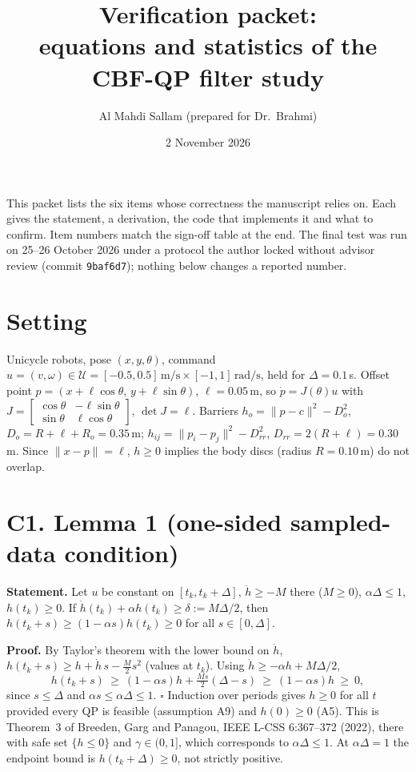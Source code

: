 \documentclass[10pt]{article}
\title{Verification packet:\\ equations and statistics of the CBF-QP filter study}
\author{Al Mahdi Sallam (prepared for Dr.~Brahmi)}
\date{2 November 2026}
\begin{document}
\maketitle
\noindent This packet lists the six items whose correctness the manuscript relies on. Each gives the
statement, a derivation, the code that implements it and what to confirm. Item numbers match the
sign-off table at the end. The final test was run on 25--26 October 2026 under a protocol the author
locked without advisor review (commit \texttt{9baf6d7}); nothing below changes a reported number.

\section*{Setting}
Unicycle robots, pose $(x,y,\theta)$, command $u=(v,\omega)\in\mathcal U=[-0.5,0.5]\,\text{m/s}\times[-1,1]\,\text{rad/s}$,
held for $\Delta=0.1$\,s. Offset point $p=(x+\ell\cos\theta,\,y+\ell\sin\theta)$, $\ell=0.05$\,m, so
$\dot p=J(\theta)u$ with $J=\begin{bmatrix}\cos\theta&-\ell\sin\theta\\ \sin\theta&\ell\cos\theta\end{bmatrix}$, $\det J=\ell$.
Barriers $h_o=\|p-c\|^2-D_o^2$, $D_o=R+\ell+R_o=0.35$\,m; $h_{ij}=\|p_i-p_j\|^2-D_{rr}^2$, $D_{rr}=2(R+\ell)=0.30$\,m.
Since $\|x-p\|=\ell$, $h\ge0$ implies the body discs (radius $R=0.10$\,m) do not overlap.

\section*{C1. Lemma 1 (one-sided sampled-data condition)}
\textbf{Statement.} Let $u$ be constant on $[t_k,t_k+\Delta]$, $\ddot h\ge-M$ there ($M\ge0$),
$\alpha\Delta\le1$, $h(t_k)\ge0$. If $\dot h(t_k)+\alpha h(t_k)\ge\delta:=M\Delta/2$, then
$h(t_k+s)\ge(1-\alpha s)h(t_k)\ge0$ for all $s\in[0,\Delta]$.

\textbf{Proof.} By Taylor's theorem with the lower bound on $\ddot h$,
$h(t_k+s)\ge h+\dot h\,s-\tfrac M2 s^2$ (values at $t_k$). Using $\dot h\ge-\alpha h+M\Delta/2$,
\[
h(t_k+s)\ \ge\ (1-\alpha s)h+\tfrac{M s}{2}(\Delta-s)\ \ge\ (1-\alpha s)h\ \ge\ 0,
\]
since $s\le\Delta$ and $\alpha s\le\alpha\Delta\le1$. $\square$
Induction over periods gives $h\ge0$ for all $t$ provided every QP is feasible (assumption A9) and
$h(0)\ge0$ (A5). This is Theorem~3 of Breeden, Garg and Panagou, IEEE L-CSS 6:367--372 (2022), there
with safe set $\{h\le0\}$ and $\gamma\in(0,1]$, which corresponds to $\alpha\Delta\le1$.
At $\alpha\Delta=1$ the endpoint bound is $h(t_k+\Delta)\ge0$, not strictly positive.
\end{document}
